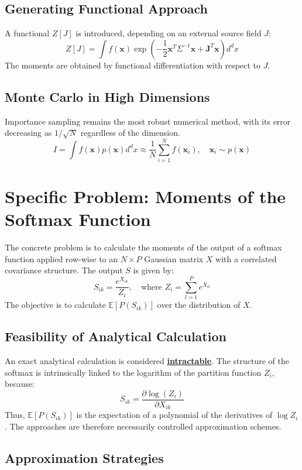 \documentclass[12pt]{article}
\begin{document}
\subsection{Generating Functional Approach}
A functional $Z[J]$ is introduced, depending on an external source field $J$:
\[
Z[J] = \int f(\mathbf{x}) \exp\left(-\frac{1}{2} \mathbf{x}^T \Sigma^{-1} \mathbf{x} + \mathbf{J}^T \mathbf{x}\right) d^d x
\]
The moments are obtained by functional differentiation with respect to $J$.

\subsection{Monte Carlo in High Dimensions}
Importance sampling remains the most robust numerical method, with its error decreasing as $1/\sqrt{N}$ regardless of the dimension.
\[
I = \int f(\mathbf{x}) p(\mathbf{x}) d^d x \approx \frac{1}{N} \sum_{i=1}^{N} f(\mathbf{x}_i), \quad \mathbf{x}_i \sim p(\mathbf{x})
\]

\section{Specific Problem: Moments of the Softmax Function}

The concrete problem is to calculate the moments of the output of a softmax function applied row-wise to an $N \times P$ Gaussian matrix $X$ with a correlated covariance structure. The output $S$ is given by:
\[
S_{ik} = \frac{e^{X_{ik}}}{Z_i}, \quad \text{where } Z_i = \sum_{l=1}^{P} e^{X_{il}}
\]
The objective is to calculate $\mathbb{E}[P(S_{ik})]$ over the distribution of $X$.

\subsection{Feasibility of Analytical Calculation}
An exact analytical calculation is considered \textbf{\underline{intractable}}. The structure of the softmax is intrinsically linked to the logarithm of the partition function $Z_i$, because:
\[
S_{ik} = \frac{\partial \log(Z_i)}{\partial X_{ik}}
\]
Thus, $\mathbb{E}[P(S_{ik})]$ is the expectation of a polynomial of the derivatives of $\log Z_i$. The approaches are therefore necessarily controlled approximation schemes.

\subsection{Approximation Strategies}
\end{document}
